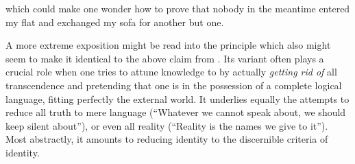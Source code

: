  which could make one wonder how to prove that
nobody in the meantime entered my flat and exchanged my sofa for another but
 one.

\pa\label{pa:distLang} A more extreme exposition might be read into the
principle which also might seem to make it identical to the above claim from
.  Its variant often plays a crucial role when one tries to
attune knowledge to  by actually {\em getting rid of} all
transcendence and pretending that one is in the possession of a complete logical
language, fitting perfectly the external world.  It underlies equally the
attempts to reduce all truth to mere language (``Whatever we cannot speak about,
we should keep silent about''), or even all reality (``Reality is the names we
give to it''). Most abstractly, it amounts to reducing identity to the
 discernible criteria of identity.


